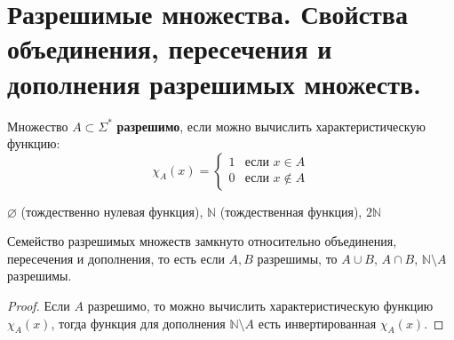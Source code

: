 \section{Разрешимые множества. Свойства объединения, пересечения и дополнения разрешимых множеств.}
\begin{definition}
	Множество $A \subset \Sigma^*$ \textbf{разрешимо}, если можно вычислить характеристическую функцию:
	\begin{equation*}
		\chi_{A}(x) = 
		\begin{cases}
			1 &\text{если $x \in A$}\\
			0 &\text{если $x \notin A$}
		\end{cases}
	\end{equation*}
\end{definition}
\begin{example}
	$\varnothing$ (тождественно нулевая функция), $\mathbb{N}$ (тождественная функция), $2\mathbb{N}$
\end{example}

\begin{proposition}
	Семейство разрешимых множеств замкнуто относительно объединения, пересечения и дополнения, то есть если $A, B$
	разрешимы, то $A \cup B$, $A \cap B$, $\mathbb{N} \setminus A$ разрешимы.
\end{proposition}
\begin{proof}
	Если $A$ разрешимо, то можно вычислить характеристическую функцию $\chi_{A}(x)$, тогда
	функция для дополнения $\mathbb{N} \setminus A$ есть инвертированная $\chi_{A}(x)$.
\end{proof}
